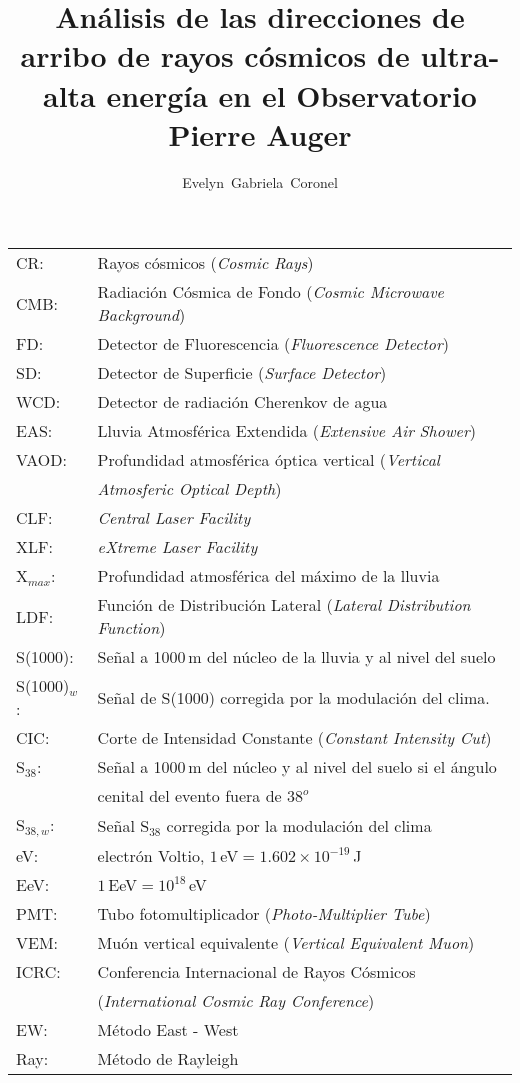 \documentclass[12pt,papel,oneside]{ibtesis}
\title{Análisis de las direcciones de arribo de rayos cósmicos de ultra-alta energía en el Observatorio Pierre Auger}
\author{Evelyn~Gabriela~Coronel}
\begin{document}
\begin{preliminary}


\begin{abreviaturas}

\begin{tabular}{l l}
CR: 		& Rayos cósmicos  (\emph{Cosmic Rays}) \\
CMB: 		& Radiación Cósmica de Fondo (\emph{Cosmic Microwave Background})\\
FD: 		& Detector de Fluorescencia (\emph{Fluorescence Detector}) \\
SD: 		& Detector de Superficie (\emph{Surface Detector})  \\
WCD: 		& Detector de radiación Cherenkov de agua\\
EAS: 		& Lluvia Atmosférica Extendida  (\emph{Extensive Air Shower})    \\
VAOD: 		& Profundidad atmosférica óptica vertical (\emph{Vertical} \\
			& \emph{Atmosferic Optical Depth})\\
CLF:		& \emph{Central Laser Facility}\\
XLF:		& \emph{eXtreme Laser Facility}\\
X$_{max}$: 	& Profundidad atmosférica del máximo de la lluvia \\
LDF: 		& Función de Distribución Lateral (\emph{Lateral Distribution Function}) \\
S(1000): 	& Señal a 1000\,m del núcleo de la lluvia y al nivel del suelo \\
S(1000)$_w$:& Señal de S(1000) corregida por la modulación del clima. \\
CIC: 		& Corte de Intensidad Constante (\emph{Constant Intensity Cut}) \\
S$_{38}$: 	& Señal a 1000\,m del núcleo y al nivel del suelo si el ángulo\\
			& cenital del evento fuera de $38^o$\\
S$_{38,w}$: & Señal S$_{38}$ corregida por la modulación del clima \\
eV: 		& electrón Voltio, $1\,$eV$= 1.602\times 10^{-19}\,$J \\
EeV: 		& $1\,$EeV$=10^{18}\,$eV\\
PMT: 		& Tubo fotomultiplicador (\emph{Photo-Multiplier Tube})\\
VEM: 		& Muón vertical equivalente (\emph{Vertical Equivalent Muon})\\
ICRC: 		& Conferencia Internacional de Rayos Cósmicos \\
			& (\emph{International Cosmic Ray Conference})\\
EW:			& Método East - West\\
Ray:		& Método de Rayleigh
\end{tabular}
\end{abreviaturas}

	\tableofcontents                %
	\listoffigures                  %


\end{preliminary}
\end{document}
